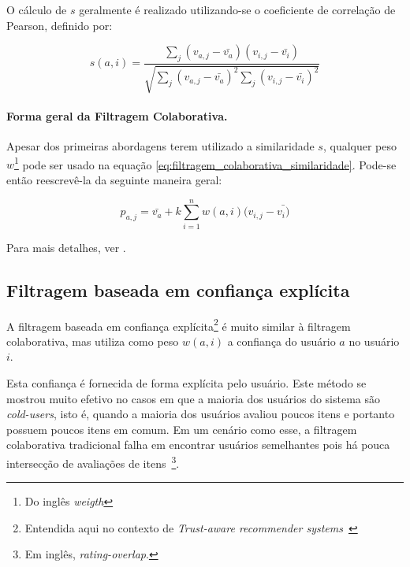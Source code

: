 O cálculo de $s$ geralmente é realizado utilizando-se o coeficiente de correlação de Pearson\cite{Breese98}, definido por:

\begin{equation}
\label{eq:calculo_s}
 s(a,i) = \frac{\sum_{j}{(v_{a,j} - \bar{v_{a}}) (v_{i,j} - \bar{v_{i}})}}{\sqrt{\sum_{j}{(v_{a,j} - \bar{v_{a}})}^2\sum_{j}{(v_{i,j} - \bar{v_{i}})}^2}}
\end{equation}

\paragraph{Forma geral da Filtragem Colaborativa.}

Apesar dos primeiras abordagens terem utilizado a similaridade $s$, qualquer peso $w$\footnote{Do inglês \textit{weigth}} pode ser usado na equação \ref{eq:filtragem_colaborativa_similaridade}. Pode-se então reescrevê-la da seguinte maneira geral:

\begin{equation}
 p_{a,j} = \bar{v_{a}} + k\sum_{i=1}^n{w(a,i) (v_{i,j} - \bar{v_{i})}}
 \label{eq:filtragem_colaborativa_geral} 
\end{equation}

Para mais detalhes, ver \cite{Breese98}.


\subsection{Filtragem baseada em confiança explícita} %
\label{sec:confianca_explicita}

A filtragem baseada em confiança explícita\footnote{Entendida aqui no contexto de \textit{Trust-aware recommender systems}~\cite{Massa07}} é muito similar à filtragem colaborativa, mas utiliza como peso $w(a,i)$ a confiança do usuário $a$ no usuário $i$.

Esta confiança é fornecida de forma explícita pelo usuário. Este método se mostrou muito efetivo no casos em que a maioria dos usuários do sistema são \textit{cold-users}, isto é, quando a maioria dos usuários avaliou poucos itens e portanto possuem poucos itens em comum. Em um cenário como esse, a filtragem colaborativa tradicional falha em encontrar usuários semelhantes pois há pouca intersecção de avaliações de itens~\footnote{Em inglês, \textit{rating-overlap}.}.


